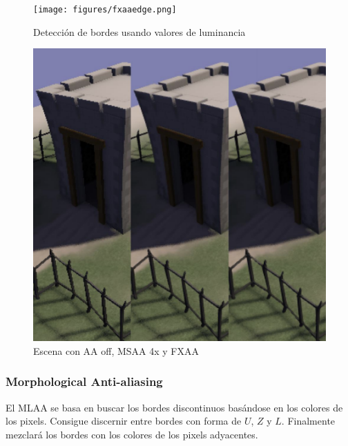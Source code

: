 \documentclass[withindex, glossary]{cam-thesis}
\begin{document}
\begin{figure}[!htbp]
    \texttt{[image: figures/fxaaedge.png]}
    \caption{Detección de bordes usando valores de luminancia\cite{fxaa2}}
    \label{fxaaedge}
\end{figure}

\begin{figure}[!htbp]
    \includegraphics[width=.8\linewidth]{figures/fxaacomparison.png}
    \caption{Escena con AA off, MSAA 4x y FXAA }
    \label{fxaacomparison}
\end{figure}

\subsubsection{Morphological Anti-aliasing}

El MLAA\cite{Reshetov:2009:MA:1572769.1572787} se basa en buscar los bordes discontinuos basándose en los colores de los pixels. Consigue discernir entre bordes con forma de $U$, $Z$ y $L$. Finalmente mezclará los bordes con los colores de los pixels adyacentes.
\end{document}
